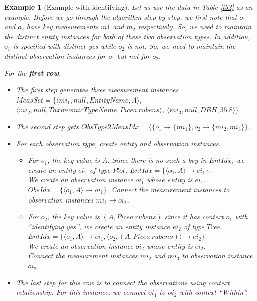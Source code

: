 \documentclass[10pt]{article}
\newtheorem{example}{Example}[section]
\begin{document}
\begin{example} [Example with identifying]\label{eg2}
Let us use the data in Table \ref{tb2} as an example.
Before we go through the algorithm step by step,  we first note that  $o_1$ and $o_2$ have key measurements $m1$ and $m_2$ respectively. 
So, we need to maintain the distinct entity instances for both of these two observation types. 
In addition, $o_1$ is specified with {\em distinct yes} while $o_2$ is not. So, we need to maintain the distinct observation instances for $o_1$ but not for $o_2$. 

For the {\bf first row}, 
\begin{itemize}
\item The first step generates three measurement instances $MeasSet=\{\langle mi_1, null, EntityName, A\rangle$, \\
$\langle mi_2, null, TaxonomicTypeName, Picea~rubens\rangle$, $\langle mi_3, null, DBH, 35.8\rangle\}$.
\item The second step gets $ObsType2MeasIdx = \{\{o_1\rightarrow \{mi_1\}, o_2 \rightarrow \{mi_2, mi_3\}\}$.
\item For each observation type, create entity and observation instances.
\begin{itemize}
\item For $o_1$, the key value is $A$. Since there is no such a key in $EntIdx$, we create an entity $ei_1$ of type $Plot$.
	$EntIdx = \{\langle o_1, A\rangle \rightarrow ei_1\}$. \\
	We create an observation instance $oi_1$ whose entity is $ei_1$.\\
	$ObsIdx = \{\langle o_1, A\rangle \rightarrow oi_1\}$.
	Connect the measurement instances to observation instances  $mi_1 \rightarrow oi_1$,
\item For $o_2$, 
	the key value is $(A, Picea~rubens)$ since it has context $o_1$ with ``{\em identifying yes}'',  we create an entity instance $ei_2$ of type $Tree$. \\
	$EntIdx = \{\langle o_1, A\rangle \rightarrow ei_1, \langle o_2, (A, Picea~rubens) \rangle \rightarrow ei_2\}$.\\
	We  create an observation instance $oi_2$ whose entity is $ei_2$.\\
	Connect the measurement instances $mi_2$ and $mi_3$  to observation instance $oi_2$.
\end{itemize}
\item The last step for this row is to connect the observations using context relationship. For this instance, we connect $oi_1$ to $oi_2$ with context ``{\em Within}''.
\end{itemize}


\end{example}
\end{document}
